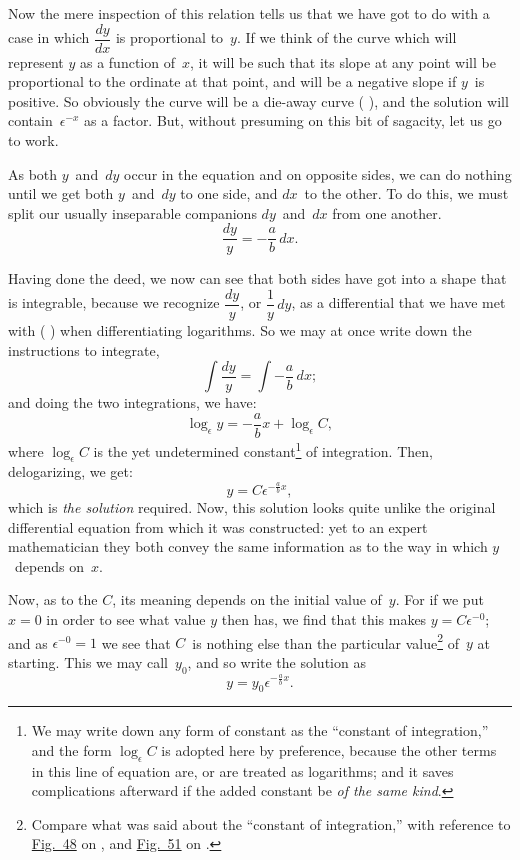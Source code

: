 \documentclass[12pt]{book}[2005/09/16]
\newcommand{\DPPageSep}[2]{\Pagelabel{#2}}
\newcommand{\Pagelabel}[1]
  {\phantomsection\label{#1}}
\newcommand{\Pageref}[2][p.]{%
  \ifthenelse{\not\equal{#1}{}}{%
    \hyperref[#2]{#1~\pageref{#2}}%
  }{%
    \hyperref[#2]{\pageref{#2}}%
  }%
}
\newcommand{\Fig}[1]{\hyperref[fig:#1]{Fig.~#1}}
\newcommand{\efrac}[2]{\frac{#1}{#2}}
\begin{document}
Now the mere inspection of this relation tells us
that we have got to do with a case in which $\dfrac{dy}{dx}$ is
proportional to~$y$. If we think of the curve which
will represent $y$ as a function of~$x$, it will be such
that its slope at any point will be proportional to
the ordinate at that point, and will be a negative
slope if $y$~is positive. So obviously the curve will
be a die-away curve (\Pageref{section:5}), and the solution will
contain~$\epsilon^{-x}$ as a factor. But, without presuming on
this bit of sagacity, let us go to work.

As both $y$~and~$dy$ occur in the equation and on
opposite sides, we can do nothing until we get both
$y$~and~$dy$ to one side, and $dx$~to the other. To do
this, we must split our usually inseparable companions
$dy$~and~$dx$ from one another.
\[
\frac{dy}{y} = - \frac{a}{b}\, dx.
\]

Having done the deed, we now can see that both
sides have got into a shape that is integrable, because
we recognize $\dfrac{dy}{y}$, or $\dfrac{1}{y}\, dy$, as a differential that we
have met with (\Pageref{expolo}) when differentiating logarithms.
So we may at once write down the instructions to
integrate,
\[
\int \frac{dy}{y} = \int -\frac{a}{b}\, dx;
\]
and doing the two integrations, we have:
\[
\log_\epsilon y = -\frac{a}{b} x + \log_\epsilon C,
\]
\DPPageSep{248.png}{236}%
where $\log_\epsilon C$ is the yet undetermined constant\footnote
  {We may write down any form of constant as the ``constant of
  integration,'' and the form $\log_\epsilon C$ is adopted here by preference,
  because the other terms in this line of equation are, or are treated
  as logarithms; and it saves complications afterward if the added
  constant be \emph{of the same kind}.}
of
integration. Then, delogarizing, we get:
\[
y = C \epsilon^{-\efrac{a}{b} x},
\]
which is \emph{the solution} required. Now, this solution
looks quite unlike the original differential equation
from which it was constructed: yet to an expert
mathematician they both convey the same information
as to the way in which $y$~depends on~$x$.

Now, as to the $C$, its meaning depends on the
initial value of~$y$. For if we put $x = 0$ in order to
see what value $y$ then has, we find that this makes
$y = C \epsilon^{-0}$; and as $\epsilon^{-0} = 1$ we see that $C$~is nothing else
than the particular value\footnote
  {Compare what was said about the ``constant of integration,''
  with reference to \Fig{48} on \Pageref{constant}, and \Fig{51} on \Pageref{fig:51}.}
 of~$y$ at starting. This we
may call~$y_0$, and so write the solution as
\[
y = y_0 \epsilon^{-\efrac{a}{b} x}.
\]
\end{document}
